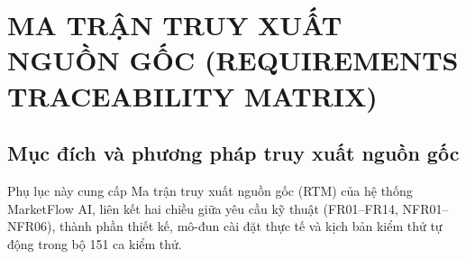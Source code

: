 \appendix
\renewcommand{\chaptername}{Phụ lục}
\renewcommand{\appendixname}{Phụ lục}
\chapter{MA TRẬN TRUY XUẤT NGUỒN GỐC (REQUIREMENTS TRACEABILITY MATRIX)}

\section{Mục đích và phương pháp truy xuất nguồn gốc}

Phụ lục này cung cấp Ma trận truy xuất nguồn gốc (RTM) của hệ thống MarketFlow AI, liên kết hai chiều giữa yêu cầu kỹ thuật (FR01--FR14, NFR01--NFR06), thành phần thiết kế, mô-đun cài đặt thực tế và kịch bản kiểm thử tự động trong bộ 151 ca kiểm thử.

